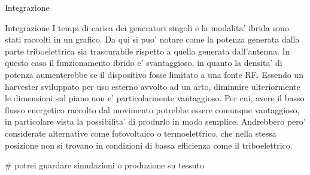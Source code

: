 \begin{section}{Integrazione}
\begin{subsection}{Integrazione}
        I tempi di carica dei generatori singoli e la modalita' ibrida sono stati raccolti in un grafico. Da qui si puo' notare come la potenza generata dalla parte triboelettrica sia trascurabile rispetto a quella generata dall'antenna. In questo caso il funzionamento ibrido e' svantaggioso, in quanto la densita' di potenza aumenterebbe se il dispositivo fosse limitato a una fonte RF. Essendo un harvester sviluppato per uso esterno avvolto ad un arto, diminuire ulteriormente le dimensioni sul piano non e' particolarmente vantaggioso. Per cui, avere il basso flusso energetico raccolto dal movimento potrebbe essere comunque vantaggioso, in particolare vista la possibilita' di produrlo in modo semplice. Andrebbero pero' considerate alternative come fotovoltaico o termoelettrico, che nella stessa posizione non si trovano in condizioni di bassa efficienza come il triboelettrico. 
    \end{subsection}

    \# potrei guardare simulazioni o produzione su tessuto

\end{section}